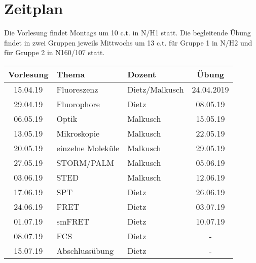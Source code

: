 \section{Zeitplan}
Die Vorlesung findet Montags um 10 c.t. in N/H1 statt. Die begleitende Übung findet in zwei Gruppen jeweils Mittwochs um 13 c.t. für Gruppe 1 in N/H2 und für Gruppe 2 in N160/107 statt.

\vspace{0.5cm}

\begin{center}
\begin{tabular}{cllc}
Vorlesung & Thema & Dozent & Übung\\
\hline
15.04.19 & Fluoreszenz & Dietz/Malkusch & 24.04.2019\\
29.04.19 & Fluorophore & Dietz & 08.05.19\\
06.05.19 & Optik & Malkusch & 15.05.19\\
13.05.19 & Mikroskopie & Malkusch & 22.05.19\\
20.05.19 & einzelne Moleküle & Malkusch & 29.05.19\\
27.05.19 & STORM/PALM & Malkusch & 05.06.19\\
03.06.19 & STED & Malkusch & 12.06.19\\
17.06.19 & SPT & Dietz & 26.06.19\\
24.06.19 & FRET & Dietz & 03.07.19\\
01.07.19 & smFRET & Dietz & 10.07.19\\
08.07.19 & FCS & Dietz & -\\
15.07.19 & Abschlussübung & Dietz & -
\end{tabular}
\end{center}